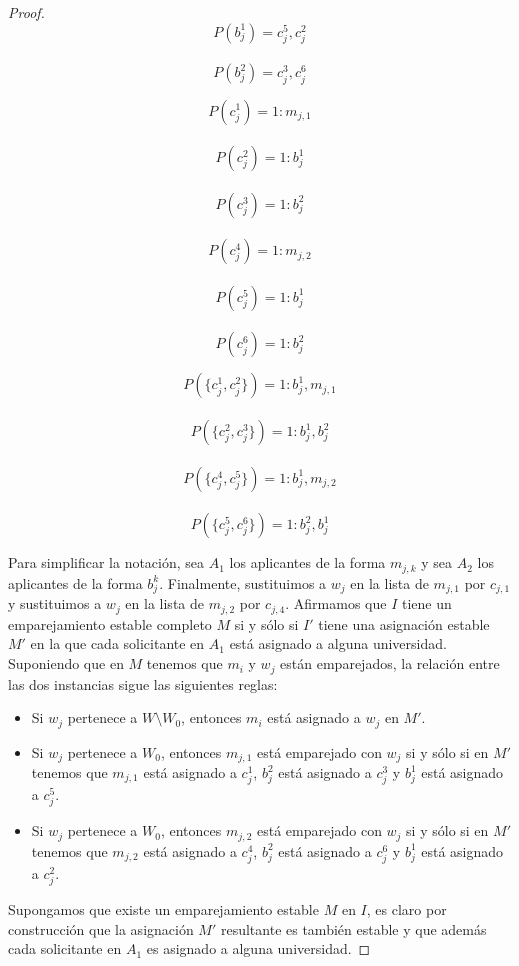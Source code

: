 \begin{proof}
\begin{minipage}{.3\linewidth}
$$P(b_j^1)=c_j^5,c_j^2$$ \\
$$P(b_j^2)=c_j^3,c_j^6$$ 
\end{minipage}%
\begin{minipage}{.3\linewidth}
$$P(c_j^1)=1:m_{j,1}$$ \\
$$P(c_j^2)=1:b_j^1$$ \\
$$P(c_j^3)=1: b_j^2$$ \\
$$P(c_j^4)=1: m_{j,2}$$ \\
$$P(c_j^5)=1: b_j^1$$ \\
$$P(c_j^6)=1: b_j^2$$ 
\end{minipage}
\begin{minipage}{.4\linewidth}
$$P(\{c_j^1,c_j^2\})= 1:b_j^1,m_{j,1}$$ \\
$$P(\{c_j^2,c_j^3\})=1:b_j^1,b_j^2$$ \\
$$P(\{c_j^4,c_j^5\})= 1:b_j^1,m_{j,2}$$ \\
$$P(\{c_j^5,c_j^6\})=1:b_j^2,b_j^1$$
\end{minipage}

\medskip

Para simplificar la notación, sea $A_1$ los aplicantes de la forma $m_{j,k}$ y sea $A_2$ los aplicantes de la forma $b_j^k$. Finalmente, sustituimos a $w_j$ en la lista de $m_{j,1}$ por $c_{j,1}$ y sustituimos a $w_j$ en la lista de $m_{j,2}$ por $c_{j,4}$. Afirmamos que $I$ tiene un emparejamiento estable completo $M$ si y sólo si $I'$ tiene una asignación estable $M'$ en la que cada solicitante en $A_1$ está asignado a alguna universidad. Suponiendo que en $M$ tenemos que $m_i$ y $w_j$ están emparejados, la relación entre las dos instancias sigue las siguientes reglas:
\begin{itemize}
\item Si $w_j$ pertenece a $W \setminus W_0$, entonces $m_i$ está asignado a $w_j$ en $M'$.
\item Si $w_j$ pertenece a $W_0$, entonces $m_{j,1}$ está emparejado con $w_j$ si y sólo si en $M'$ tenemos que $m_{j,1}$ está asignado a $c_j^1$, $b_j^2$ está asignado a $c_j^3$ y $b_j^1$ está asignado a $c_j^5$.
\item Si $w_j$ pertenece a $W_0$, entonces $m_{j,2}$ está emparejado con $w_j$ si y sólo si en $M'$ tenemos que $m_{j,2}$ está asignado a $c_j^4$, $b_j^2$ está asignado a $c_j^6$ y $b_j^1$ está asignado a $c_j^2$.
\end{itemize}

Supongamos que existe un emparejamiento estable $M$ en $I$, es claro por construcción que la asignación $M'$ resultante es también estable y que además cada solicitante en $A_1$ es asignado a alguna universidad. 


\end{proof}
